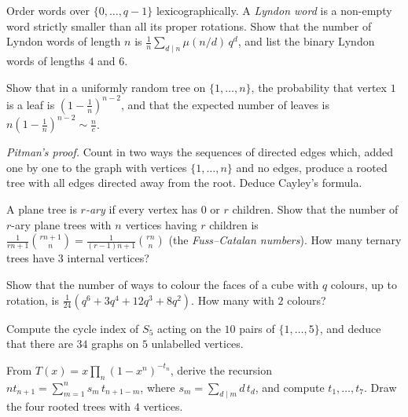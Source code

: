 \begin{exercise}[$\star\star$]\label{ex:lyndon}
Order words over $\{0,\dots,q-1\}$ lexicographically. A \emph{Lyndon word} is a non-empty word strictly smaller than all its proper
rotations. Show that the number of Lyndon words of length $n$ is $\frac1n\sum_{d\mid n}\mu(n/d)\,q^d$, and list the binary Lyndon words of
lengths $4$ and $6$.
\end{exercise}

\begin{exercise}[$\star$]\label{ex:leaf}
Show that in a uniformly random tree on $\{1,\dots,n\}$, the probability that vertex $1$ is a leaf is $(1-\frac1n)^{n-2}$, and that the expected
number of leaves is $n(1-\frac1n)^{n-2}\sim\frac ne$.
\end{exercise}

\begin{exercise}[$\star\star$]\label{ex:pitman}
\emph{Pitman's proof.} Count in two ways the sequences of directed edges which, added one by one to the graph with vertices
$\{1,\dots,n\}$ and no edges, produce a rooted tree with all edges directed away from the root. Deduce Cayley's formula.
\end{exercise}

\begin{exercise}[$\star\star$]\label{ex:fusscatalan}
A plane tree is \emph{$r$-ary} if every vertex has $0$ or $r$ children. Show that the number of $r$-ary plane trees with $n$ vertices having
$r$ children is $\frac1{rn+1}\binom{rn+1}n=\frac1{(r-1)n+1}\binom{rn}n$ (the \emph{Fuss--Catalan numbers}). How many ternary trees have $3$ internal
vertices?
\end{exercise}

\begin{exercise}[$\star$]\label{ex:cube}
Show that the number of ways to colour the faces of a cube with $q$ colours, up to rotation, is $\frac1{24}(q^6+3q^4+12q^3+8q^2)$. How many
with $2$ colours?
\end{exercise}

\begin{exercise}[$\star\star$]\label{ex:graphs5}
Compute the cycle index of $S_5$ acting on the $10$ pairs of $\{1,\dots,5\}$, and deduce that there are $34$ graphs on $5$ unlabelled
vertices.
\end{exercise}

\begin{exercise}[$\star\star$]\label{ex:rootedrec}
From $T(x)=x\prod_n(1-x^n)^{-t_n}$, derive the recursion $nt_{n+1}=\sum_{m=1}^ns_m\,t_{n+1-m}$, where $s_m=\sum_{d\mid m}d\,t_d$, and compute $t_1,\dots,t_7$.
Draw the four rooted trees with $4$ vertices.
\end{exercise}

